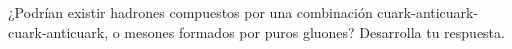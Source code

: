 \documentclass[./../main.tex]{subfiles}
\begin{document}
	\begin{exercise}
		¿Podrían existir hadrones compuestos por una combinación cuark-anticuark-cuark-anticuark, o mesones formados por puros gluones? Desarrolla tu respuesta.
	\end{exercise}
\end{document}
